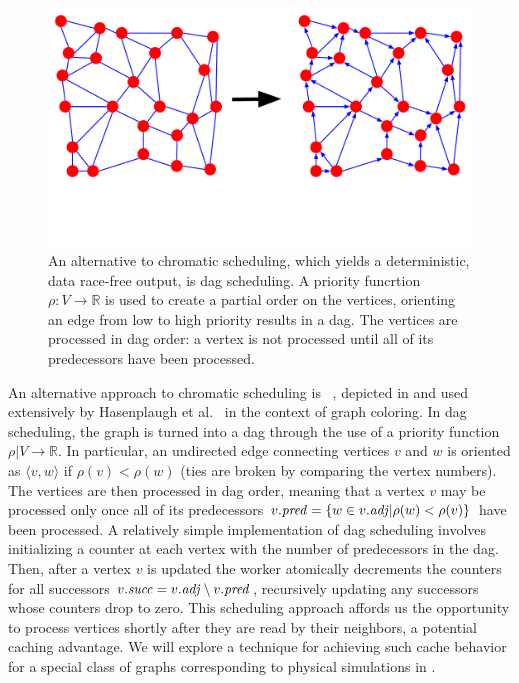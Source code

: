\begin{figure}[!h]
\centering
\includegraphics[width=4.5in,clip,trim=0 3cm 0 0]{figures/dag_scheduling.pdf}
\caption{An alternative to chromatic scheduling, which 
yields a deterministic, data race-free output, is dag scheduling.
A priority funcrtion $\rho : V \rightarrow \mathbb{R}$ is used
to create a partial order on the vertices, orienting an edge from
low to high priority results in a 
dag.  The vertices are processed in dag order: a vertex is not
processed until all of its predecessors have been processed.}
\label{fig:dag_scheduling}
\end{figure}

An alternative approach to chromatic scheduling is 
~\cite{JonesPl93},
depicted in  and used extensively by 
Hasenplaugh et al.~\cite{HasenplaughKaLe14} in the context of graph
coloring.  In dag scheduling, the graph
is turned into a dag through the use of a priority function 
$\rho | V \rightarrow \mathbb{R}$.  In particular, an undirected
edge connecting vertices $v$ and $w$ is oriented as $\langle v, w \rangle$
if $\rho(v) < \rho(w)$ (ties are broken by comparing the vertex numbers).  
The vertices are then processed in dag order, meaning that a vertex
$v$ may be processed only once all of its predecessors 
$\attrib{v}{\id{pred}} = \set{w \in \attrib{v}{\id{adj}} | \rho(w) < \rho(v)}$
have been processed.  A relatively simple implementation of dag
scheduling involves initializing a counter at each vertex with the 
number of predecessors in the dag.  Then, after a vertex $v$ is updated
the worker atomically decrements the counters for all successors 
$\attrib{v}{\id{succ}} = \attrib{v}{\id{adj}} \setminus \attrib{v}{\id{pred}}$,
recursively updating any successors whose counters drop to zero.
This scheduling approach affords us the opportunity
to process vertices shortly after they are read by their neighbors,
a potential caching advantage.  We will explore a technique 
for achieving such cache behavior for a special class of graphs 
corresponding to physical simulations in .



